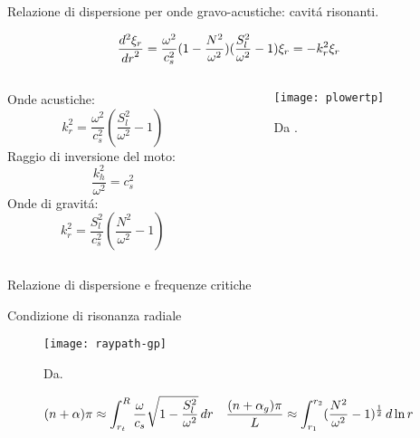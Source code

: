 \documentclass[10pt,xcolor={usenames},fleqn,mathserif,serif]{beamer}
\begin{document}
\begin{frame}{Relazione di dispersione per onde gravo-acustiche: cavit\'a risonanti.}


\begin{align*}
&\TtwoDy{r}{\xi_r}=\frac{\omega^2}{c_s^2}(1-\frac{N^2}{\omega^2})(\frac{S_l^2}{\omega^2}-1)\xi_r=-k_r^2\xi_r
\end{align*}

\begin{columns}

\begin{column}{0.4\textwidth}
Onde acustiche:\[k_r^2=\frac{\omega^2}{c_s^2}(\frac{S_l^2}{\omega^2}-1)\]
Raggio di inversione del moto:\[\frac{k_h^2}{\omega^2}=c_s^2\]
Onde di gravit\'a:\[k_r^2=\frac{S_l^2}{c_s^2}(\frac{N^2}{\omega^2}-1)\]

\end{column}

\begin{column}{0.6\textwidth}

\begin{figure}[!ht]
\centering
\texttt{[image: plowertp]}
\caption{Da \cite{dal03notes}.}\label{fig:plowertp}
\end{figure}

\end{column}

\end{columns}

\end{frame}

\begin{wordonframe}{Relazione di dispersione e frequenze critiche}

\end{wordonframe}

\begin{frame}{Condizione di risonanza radiale}


\begin{figure}[!ht]
\centering
\texttt{[image: raypath-gp]}
\caption{Da\cite{gou91seismic}.}
\end{figure}

\begin{align*}
&(n+\alpha)\pi\approx\int_{r_t}^R\frac{\omega}{c_s}\sqrt{1-\frac{S_l^2}{\omega^2}}\,dr
\quad
\frac{(n+\alpha_g)\pi}{L}\approx\int_{r_1}^{r_2}(\frac{N^2}{\omega^2}-1)\expy{\frac{1}{2}}\,d\ln{r}
\end{align*}

\end{frame}
\end{document}

